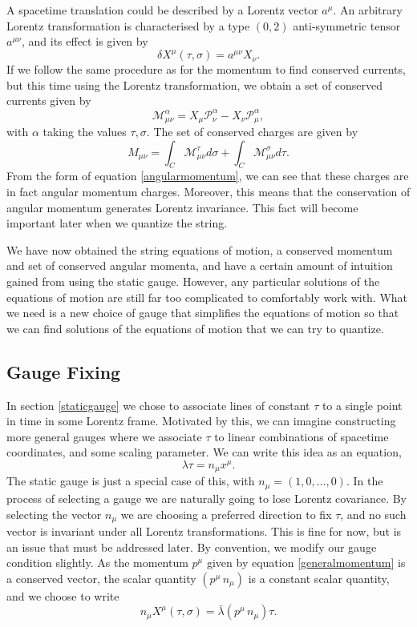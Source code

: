 \documentclass[a4paper,12pt]{article}
\numberwithin{equation}{section}
\begin{document}
A spacetime translation could be described by a Lorentz vector $a^\mu$. An arbitrary Lorentz transformation is characterised by a type $(0,2)$ anti-symmetric tensor $a^{\mu\nu}$, and its effect is given by
\begin{equation}
\delta X^\mu(\tau,\sigma) = a^{\mu\nu}X_\nu.
\end{equation}
If we follow the same procedure as for the momentum to find conserved currents, but this time using the Lorentz transformation, we obtain a set of conserved currents given by
\begin{equation}\label{angularmomentum}
\mathcal{M}_{\mu \nu}^\alpha = X_\mu \mathcal{P}_\nu^\alpha - X_\nu\mathcal{P}_\mu^\alpha,
\end{equation}
 with $\alpha$ taking the values $\tau, \sigma$.
The set of conserved charges are given by
\begin{equation}
M_{\mu\nu} = \int_C \mathcal{M}_{\mu\nu}^\tau d\sigma + \int_C \mathcal{M}_{\mu\nu}^\sigma d\tau.
\end{equation}
From the form of equation \ref{angularmomentum}, we can see that these charges are in fact angular momentum charges. Moreover, this means that the conservation of angular momentum generates Lorentz invariance. This fact will become important later when we quantize the string.

We have now obtained the string equations of motion, a conserved momentum and set of conserved angular momenta, and have a certain amount of intuition gained from using the static gauge. However, any particular solutions of the equations of motion are still far too complicated to comfortably work with. What we need is a new choice of gauge that simplifies the equations of motion so that we can find solutions of the equations of motion that we can try to quantize.

\subsection{Gauge Fixing}
In section \ref{staticgauge} we chose to associate lines of constant $\tau$ to a single point in time in some Lorentz frame. Motivated by this, we can imagine constructing more general gauges where we associate $\tau$ to linear combinations of spacetime coordinates, and some scaling parameter. We can write this idea as an equation, 
\begin{equation}
\lambda \tau = n_\mu x^\mu. 
\end{equation} 
The static gauge is just a special case of this, with $n_\mu = (1, 0, \dots, 0)$. In the process of selecting a gauge we are naturally going to lose Lorentz covariance. By selecting the vector $n_\mu$ we are choosing a preferred direction to fix $\tau$, and no such vector is invariant under all Lorentz transformations. This is fine for now, but is an issue that must be addressed later. By convention, we modify our gauge condition slightly. As the momentum $p^\mu$ given by equation \ref{generalmomentum} is a conserved vector, the scalar quantity $(p^\mu\,n_\mu)$ is a constant scalar quantity, and we choose to write
\begin{equation}
n_\mu X^\mu (\tau, \sigma) = \bar{\lambda}(p^\mu\,n_\mu)\tau.
\end{equation}
\end{document}
